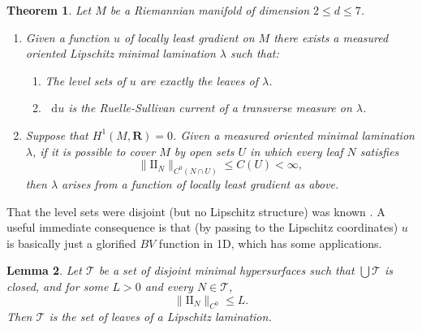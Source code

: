 \documentclass[reqno,11pt]{amsart}
\newcommand{\RR}{\mathbf{R}}
\newcommand*\dif{\mathop{}\!\mathrm{d}}
\newcommand{\Two}{\mathrm{I\!I}}
\newtheorem{theorem}{Theorem}[section]
\newtheorem{lemma}[theorem]{Lemma}
\newtheorem{corollary}[theorem]{Corollary}
\theoremstyle{definition}
\numberwithin{equation}{section}
\begin{document}
\begin{theorem}\label{main thm 1}
Let $M$ be a Riemannian manifold of dimension $2 \leq d \leq 7$.
\begin{enumerate}
\item Given a function $u$ of locally least gradient on $M$ there exists a measured oriented Lipschitz minimal lamination $\lambda$ such that:
\begin{enumerate}
\item The level sets of $u$ are exactly the leaves of $\lambda$.
\item $\dif u$ is the Ruelle-Sullivan current of a transverse measure on $\lambda$.
\end{enumerate}
\item Suppose that $H^1(M, \RR) = 0$. Given a measured oriented minimal lamination $\lambda$, if it is possible to cover $M$ by open sets $U$ in which every leaf $N$ satisfies 
$$\|\Two_N\|_{C^0(N \cap U)} \leq C(U) < \infty,$$
then $\lambda$ arises from a function of locally least gradient as above.
\end{enumerate}
\end{theorem}

That the level sets were disjoint (but no Lipschitz structure) was known \cite{Auer12}.
A useful immediate consequence is that (by passing to the Lipschitz coordinates) $u$ is basically just a glorified $BV$ function in 1D, which has some applications.


\begin{lemma}\label{main thm 2}
Let $\mathscr T$ be a set of disjoint minimal hypersurfaces such that $\bigcup \mathscr T$ is closed, and for some $L > 0$ and every $N \in \mathscr T$,
$$\|\Two_N\|_{C^0} \leq L.$$
Then $\mathscr T$ is the set of leaves of a Lipschitz lamination.
\end{lemma}
 
\end{document}
